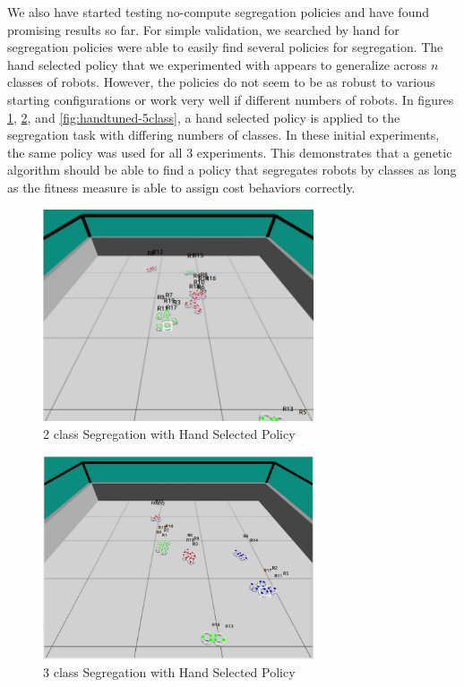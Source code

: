 \documentclass[conference]{IEEEtran}
\begin{document}
  We also have started testing no-compute segregation policies and have found promising results so far. For simple validation, we searched by hand for segregation policies were able to easily find several policies for segregation. The hand selected policy that we experimented with appears to generalize across $n$ classes of robots. However, the policies do not seem to be as robust to various starting configurations or work very well if different numbers of robots. In figures \ref{fig:handtuned-2class}, \ref{fig:handtuned-3class}, and \ref{fig:handtuned-5class}, a hand selected policy is applied to the segregation task with differing numbers of classes. In these initial experiments, the same policy was used for all 3 experiments. This demonstrates that a genetic algorithm should be able to find a policy that segregates robots by classes as long as the fitness measure is able to assign cost behaviors correctly.
  
  \begin{figure}
    \centering
    \includegraphics[width=8cm]{handtuned-2class.png}
    \caption{2 class Segregation with Hand Selected Policy}
    \label{fig:handtuned-2class}
  \end{figure}

  \begin{figure}
    \centering
    \includegraphics[width=8cm]{handtuned-3class.png}
    \caption{3 class Segregation with Hand Selected Policy}
    \label{fig:handtuned-3class}
  \end{figure}
\end{document}
